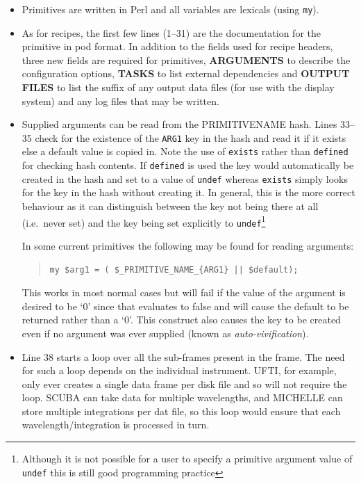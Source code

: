 \documentclass[twoside,11pt]{article}
\renewcommand{\_}{\texttt{\symbol{95}}}
\newenvironment{myquote}{\begin{quote}\begin{small}}{\end{small}\end{quote}}
\begin{document}
\begin{itemize}

\item Primitives are written in Perl and all variables are lexicals
(using \texttt{my}).

\item As for recipes, the first few lines (1--31) are the
documentation for the primitive in pod format. In addition to the
fields used for recipe headers, three new fields are required for
primitives, \textbf{ARGUMENTS} to describe the configuration options,
\textbf{TASKS} to list external dependencies and \textbf{OUTPUT FILES}
to list the suffix of any output data files (for use with the display
system) and any log files that may be written.

\item Supplied arguments can be read from the \_PRIMITIVE\_NAME\_
hash. Lines 33--35 check for the existence of the \texttt{ARG1}
key in the hash and read it if it exists else a default value is
copied in. Note the use of \texttt{exists} rather than
\texttt{defined} for checking hash contents. If \texttt{defined} is
used the key would automatically be created in the hash and set to a value of
\texttt{undef} whereas \texttt{exists} simply looks for the key in the 
hash without creating it. In general, this is the more correct
behaviour as it can distinguish between the key not being there at all 
(i.e.\ never set) and the key being set explicitly to
\texttt{undef}\footnote{Although it is not possible for a user to
specify a primitive argument value of \texttt{undef} this is still
good programming practice}

In some current primitives the following may
be found for reading arguments:
\begin{myquote}
\begin{verbatim}
my $arg1 = ( $_PRIMITIVE_NAME_{ARG1} || $default);
\end{verbatim}
\end{myquote} %
This works in most normal cases but will fail if the value of the
argument is desired to be `0' since that evaluates to false and will
cause the default to be returned rather than a `0'. This construct
also causes the key to be created even if no argument was ever
supplied (known as \emph{auto-vivification}).

\item Line 38 starts a loop over all the sub-frames present in the
frame. The need for such a loop depends on the individual instrument.
UFTI, for example, only ever creates a single data frame per disk file
and so will not require the loop. SCUBA can take data for multiple
wavelengths, and MICHELLE can store multiple integrations per dat
file, so this loop would ensure that each wavelength/integration is
processed in turn.


\end{itemize}
\end{document}
